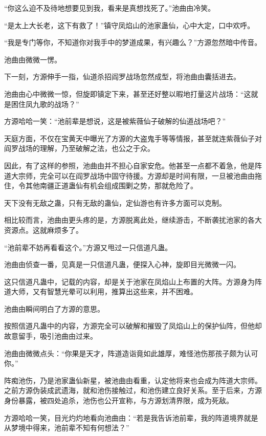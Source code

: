 
\begin{this_body}

“你这么迫不及待地想要见到我，看来是真想找死了。”池曲由冷笑。

“是太上大长老，这下有救了！”镇守凤焰山的池家蛊仙，心中大定，口中欢呼。

“我是专门等你，不知道你对我手中的梦道成果，有兴趣么？”方源忽然暗中传音。

池曲由微微一愣。

下一刻，方源伸手一指，仙道杀招阎罗战场忽然成型，将池曲由囊括进去。

池曲由心中微微一惊，但旋即镇定下来，甚至还好整以暇地打量这片战场：“这就是困住凤九歌的战场？”

方源哈哈一笑：“池前辈是想说，这是被紫薇仙子破解的仙道战场吧？”

天庭方面，不仅在宝黄天中曝光了方源的大盗鬼手等等情报，甚至就连紫薇仙子对阎罗战场的理解，乃至破解之法，也公之于众。

因此，有了这样的参照，池曲由并不担心自家安危。他甚至一点都不着急，他是阵道大宗师，完全可以在阎罗战场中固守待援。方源却是时间有限，一旦被池曲由拖住，令其他南疆正道蛊仙有机会组成围剿之势，那就危险了。

天下没有无敌之蛊，只有无敌的蛊仙，定仙游也有许多方面可以克制。

相比较而言，池曲由更头疼的是，方源脱离此处，继续游击，不断袭扰池家的各大资源点。这就麻烦多了。

“池前辈不妨再看看这个。”方源又甩过一只信道凡蛊。

池曲由侦查一番，见真是一只信道凡蛊，便探入心神，旋即目光微微一闪。

这只信道凡蛊中，记载的内容，却是关于池家在凤焰山上布置的大阵。方源身为阵道大师，又有智慧光晕可以利用，推算出这些来，并不困难。

池曲由瞬间明白了方源的意思。

按照信道凡蛊中的内容，方源完全可以破解和摧毁了凤焰山上的保护仙阵，但他却故意留手，吸引池曲由过来。

池曲由微微点头：“你果是天才，阵道造诣竟如此雄厚，难怪池伤那孩子颇为认可你。”

阵痴池伤，乃是池家蛊仙新星，被池曲由看重，认定他将来也会成为阵道大宗师。之前方源伪装成武遗海，就和池伤接触过，和池伤建立良好关系。至于后来，方源身份暴露，被四处追杀，池伤也公开宣称，与方源划清界限，成为死敌。

方源哈哈一笑，目光灼灼地看向池曲由：“若是我告诉池前辈，我的阵道境界就是从梦境中得来，池前辈不知有何想法？”


\end{this_body}
